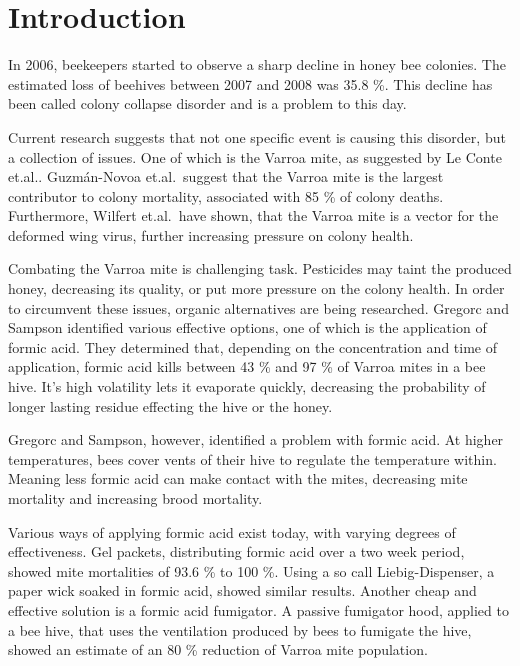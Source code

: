 \section{Introduction}\label{sec:introduction}

In 2006, beekeepers started to observe a sharp decline in honey bee colonies\cite{ColonyCollapseDisorder}.
The estimated loss of beehives between 2007 and 2008 was 35.8 \%.
This decline has been called colony collapse disorder and is a problem to this day.

Current research suggests that not one specific event is causing this disorder, but a collection of issues\cite{VarroaMitesAndHoneyBeeHealth}.
One of which is the Varroa mite, as suggested by Le Conte et.al.\cite{VarroaMitesAndHoneyBeeHealth}.
Guzmán-Novoa et.al.\ suggest that the Varroa mite is the largest contributor to colony mortality, associated with 85 \% of colony deaths\cite{VarroaDestructorIsTheMainCulprit}.
Furthermore, Wilfert et.al.\ have shown, that the Varroa mite is a vector for the deformed wing virus, further increasing pressure on colony health\cite{DeformedWingVirusDueToVarroa}.

Combating the Varroa mite is challenging task.
Pesticides may taint the produced honey, decreasing its quality, or put more pressure on the colony health\cite{PesticidesInHoney}.
In order to circumvent these issues, organic alternatives are being researched.
Gregorc and Sampson identified various effective options, one of which is the application of formic acid\cite{DiagnosisOfVarroaMiteAndSustainableControl}.
They determined that, depending on the concentration and time of application, formic acid kills between 43 \% and 97 \% of Varroa mites in a bee hive.
It's high volatility lets it evaporate quickly, decreasing the probability of longer lasting residue effecting the hive or the honey.

Gregorc and Sampson, however, identified a problem with formic acid\cite{DiagnosisOfVarroaMiteAndSustainableControl}.
At higher temperatures, bees cover vents of their hive to regulate the temperature within.
Meaning less formic acid can make contact with the mites, decreasing mite mortality and increasing brood mortality.

Various ways of applying formic acid exist today, with varying degrees of effectiveness.
Gel packets, distributing formic acid over a two week period, showed mite mortalities of 93.6 \% to 100 \%\cite{FormicAcidBasedTreatments}.
Using a so call Liebig-Dispenser, a paper wick soaked in formic acid, showed similar results\cite{FormicAcidBasedTreatments}.
Another cheap and effective solution is a formic acid fumigator\cite{FormicAcidFumigator}.
A passive fumigator hood, applied to a bee hive, that uses the ventilation produced by bees to fumigate the hive, showed an estimate of an 80 \% reduction of Varroa mite population.

